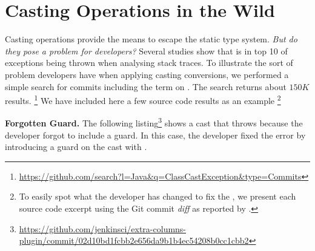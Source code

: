 
\newcommand{\ctag}[1]{\textsl{#1}}

\newcommand{\patternsection}[1]{\noindent\textbf{#1.}}

\newenvironment{pattern}[1]{
	\newcommand{\desc}{\patternsection{Description}}
	\newcommand{\instances}{\patternsection{Instances}}
	\newcommand{\detection}{\patternsection{Detection}}
	\newcommand{\discussion}{\patternsection{Discussion}}
	\newcommand{\pname}{\textsc{#1}}
	\subsection{#1}
	\desc
}{}


\chapter{Casting Operations in the Wild}
\label{cha:casts}


Casting operations provide the means to escape the static type system.
\emph{But do they pose a problem for developers?}
Several studies
\citep{kechagiaUndocumentedUncheckedExceptions2014,coelhoUnveilingExceptionHandling2015,zhitnitskyTop10Exception2016}
show that  is in top 10 of exceptions being
thrown when analysing stack traces.
%
To illustrate the sort of problem developers have when applying casting
conversions, we performed a simple search for
commits
including the term  on \github.
The search returns about
$150K$
results.%
\footnote{\url{https://github.com/search?l=Java&q=ClassCastException&type=Commits}}
We have included here a few source code results as an example%
\footnote{To easily spot what the developer has changed to fix
the , we present each source code excerpt
using the Git commit \emph{diff} as reported by \github{}.}

\textbf{Forgotten Guard.}
The following listing\footnote{\url{https://github.com/jenkinsci/extra-columns-plugin/commit/02d10bd1fcbb2e656da9b1b4ec54208b0cc1cbb2}}
shows a cast that throws  because the developer forgot to include a guard.
In this case, the developer fixed the error by introducing a guard on the cast with .

